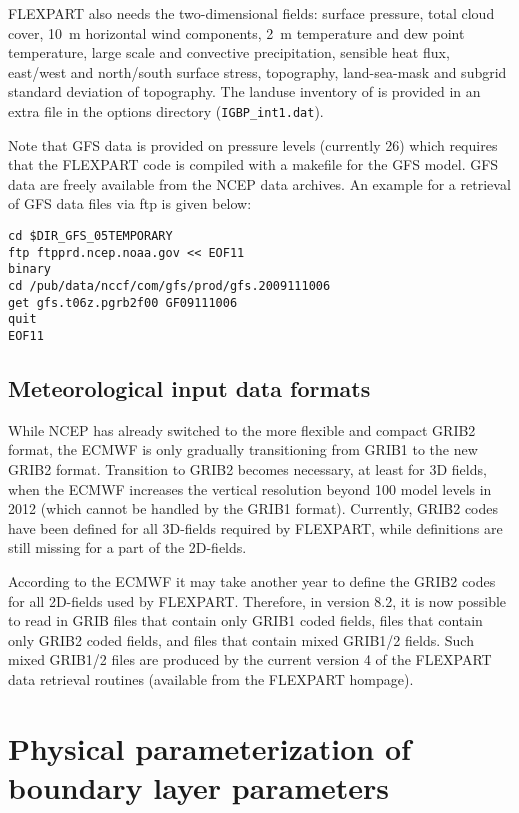 \documentclass{egu}            %
\begin{document}
FLEXPART also needs the two-dimensional fields: surface pressure, total cloud
cover, 10~m horizontal wind components, 2~m temperature and dew point
temperature, large scale and convective precipitation, sensible heat flux,
east/west and north/south surface stress, topography, land-sea-mask and subgrid
standard deviation of topography.  The landuse inventory of \citet{belward1999}
is provided in an extra file in the options directory (\verb|IGBP_int1.dat|).

Note that GFS data is provided on pressure levels (currently 26) which requires
that the FLEXPART code is compiled with a makefile for the GFS model. GFS data
are freely available from the NCEP data archives. An example for a retrieval
of GFS data files via ftp is given below:

\begin{small}
\begin{verbatim}
cd $DIR_GFS_05TEMPORARY
ftp ftpprd.ncep.noaa.gov << EOF11
binary
cd /pub/data/nccf/com/gfs/prod/gfs.2009111006
get gfs.t06z.pgrb2f00 GF09111006
quit
EOF11
\end{verbatim}
\end{small}

\subsection{Meteorological input data formats}

While NCEP has already switched to the more flexible and compact GRIB2 format,
the ECMWF is only gradually transitioning from GRIB1 to the new GRIB2 format.
Transition to GRIB2 becomes necessary, at least for 3D fields, when the ECMWF
increases the vertical resolution beyond 100 model levels in 2012 (which cannot
be handled by the GRIB1 format).  Currently, GRIB2 codes have been defined for
all 3D-fields required by FLEXPART, while definitions are still missing for a
part of the 2D-fields.

According to the ECMWF it may take another year to define the GRIB2 codes for
all 2D-fields used by FLEXPART.  Therefore, in version 8.2, it is now possible
to read in GRIB files that contain only GRIB1 coded fields, files that contain
only GRIB2 coded fields, and files that contain mixed GRIB1/2 fields.  Such
mixed GRIB1/2 files are produced by the current version 4 of the FLEXPART data
retrieval routines (available from the FLEXPART hompage).

\section[Physical parameterizations]{Physical parameterization of boundary layer parameters}
\end{document}
